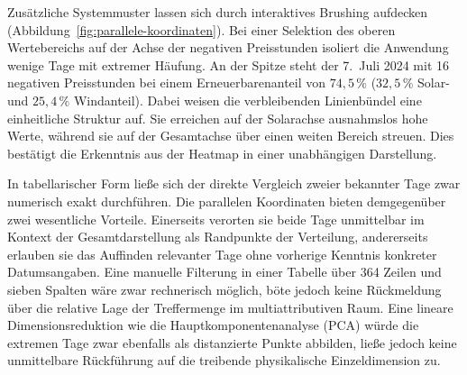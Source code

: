 Zusätzliche Systemmuster lassen sich durch interaktives Brushing aufdecken (Abbildung~\ref{fig:parallele-koordinaten}). Bei einer Selektion des oberen Wertebereichs auf der Achse der negativen Preisstunden isoliert die Anwendung wenige Tage mit extremer Häufung. An der Spitze steht der 7.\ Juli 2024 mit 16 negativen Preisstunden bei einem Erneuerbarenanteil von $74{,}5\,\%$ ($32{,}5\,\%$ Solar- und $25{,}4\,\%$ Windanteil). Dabei weisen die verbleibenden Linienbündel eine einheitliche Struktur auf. Sie erreichen auf der Solarachse ausnahmslos hohe Werte, während sie auf der Gesamtachse über einen weiten Bereich streuen. Dies bestätigt die Erkenntnis aus der Heatmap in einer unabhängigen Darstellung.

In tabellarischer Form ließe sich der direkte Vergleich zweier bekannter Tage zwar numerisch exakt durchführen. Die parallelen Koordinaten bieten demgegenüber zwei wesentliche Vorteile. Einerseits verorten sie beide Tage unmittelbar im Kontext der Gesamtdarstellung als Randpunkte der Verteilung, andererseits erlauben sie das Auffinden relevanter Tage ohne vorherige Kenntnis konkreter Datumsangaben. Eine manuelle Filterung in einer Tabelle über 364 Zeilen und sieben Spalten wäre zwar rechnerisch möglich, böte jedoch keine Rückmeldung über die relative Lage der Treffermenge im multiattributiven Raum. Eine lineare Dimensionsreduktion wie die Hauptkomponentenanalyse (PCA) würde die extremen Tage zwar ebenfalls als distanzierte Punkte abbilden, ließe jedoch keine unmittelbare Rückführung auf die treibende physikalische Einzeldimension zu.
